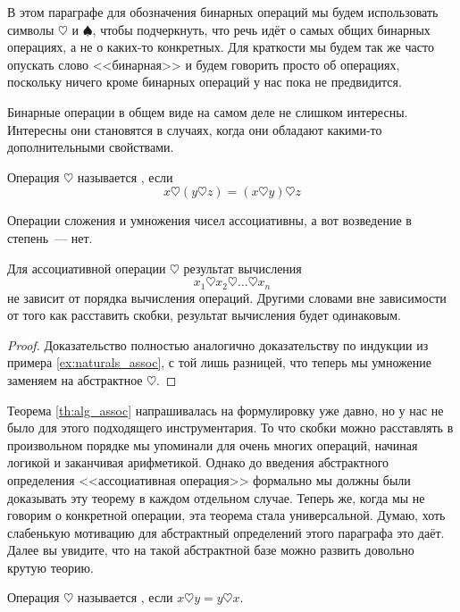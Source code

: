 В этом параграфе для обозначения бинарных операций мы будем использовать символы $\heartsuit$ и $\spadesuit$, чтобы подчеркнуть, что речь идёт о самых общих бинарных операциях, а не о каких-то конкретных. Для краткости мы будем так же часто опускать слово <<бинарная>> и будем говорить просто об операциях, поскольку ничего кроме бинарных операций у нас пока не предвидится.

Бинарные операции в общем виде на самом деле не слишком интересны. Интересны они становятся в случаях, когда они обладают какими-то дополнительными свойствами.

\begin{definition}
Операция $\heartsuit$ называется , если
$$x\heartsuit(y\heartsuit z) = (x\heartsuit y)\heartsuit z$$
\end{definition}

\begin{example}
Операции сложения и умножения чисел ассоциативны, а вот возведение в степень~--- нет.
\end{example}

\begin{thm}\label{th:alg_assoc}
Для ассоциативной операции $\heartsuit$ результат вычисления
$$x_1\heartsuit x_2\heartsuit\ldots\heartsuit x_n$$
не зависит от порядка вычисления операций. Другими словами вне зависимости от того как расставить скобки, результат вычисления будет одинаковым.
\end{thm}
\begin{proof}
Доказательство полностью аналогично доказательству по индукции из примера \ref{ex:naturals_assoc}, с той лишь разницей, что теперь мы умножение заменяем на абстрактное $\heartsuit$.
\end{proof}

Теорема \ref{th:alg_assoc} напрашивалась на формулировку уже давно, но у нас не было для этого подходящего инструментария. То что скобки можно расставлять в произвольном порядке мы упоминали для очень многих операций, начиная логикой и заканчивая арифметикой. Однако до введения абстрактного определения <<ассоциативная операция>> формально мы должны были доказывать эту теорему в каждом отдельном случае. Теперь же, когда мы не говорим о конкретной операции, эта теорема стала универсальной. Думаю, хоть слабенькую мотивацию для абстрактный определений этого параграфа это даёт. Далее вы увидите, что на такой абстрактной базе можно развить довольно крутую теорию.

\begin{definition}
Операция $\heartsuit$ называется , если $x\heartsuit y = y\heartsuit x$.
\end{definition}


